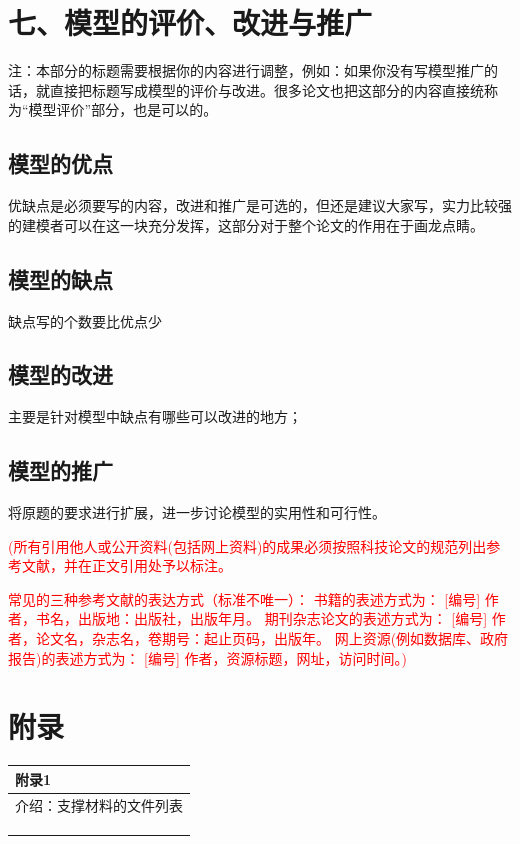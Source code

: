 \documentclass{my_paper}
\begin{document}
\section{七、模型的评价、改进与推广}
注：本部分的标题需要根据你的内容进行调整，例如：如果你没有写模型推广的话，就直接把标题写成模型的评价与改进。很多论文也把这部分的内容直接统称为“模型评价”部分，也是可以的。

\subsection{模型的优点}
优缺点是必须要写的内容，改进和推广是可选的，但还是建议大家写，实力比较强的建模者可以在这一块充分发挥，这部分对于整个论文的作用在于画龙点睛。
\subsection{模型的缺点}
缺点写的个数要比优点少
\subsection{模型的改进}
主要是针对模型中缺点有哪些可以改进的地方\cite{risken1996fokker}；
\subsection{模型的推广}
将原题的要求进行扩展\cite{rossler1979equation}，进一步讨论模型的实用性和可行性\cite{mckean1970nagumo}。

\begin{center}
\end{center}
\textcolor{red}{(所有引用他人或公开资料(包括网上资料)的成果必须按照科技论文的规范列出参考文献，并在正文引用处予以标注。}

\textcolor{red}{常见的三种参考文献的表达方式（标准不唯一）：
书籍的表述方式为： [编号] 作者，书名，出版地：出版社，出版年月。
期刊杂志论文的表述方式为： [编号] 作者，论文名，杂志名，卷期号：起止页码，出版年。
网上资源(例如数据库、政府报告)的表述方式为： [编号] 作者，资源标题，网址，访问时间。)}
\newpage
\section{附录}

\begin{table}[htbp]
    \centering
    \begin{tabular}{|p{14.0cm}|}
    \hline
    \textbf{附录1} \\ %
    \hline
    介绍：支撑材料的文件列表  \\ 
    \\
    \\
    \\
    \hline
    \end{tabular}
\end{table}
\end{document}
